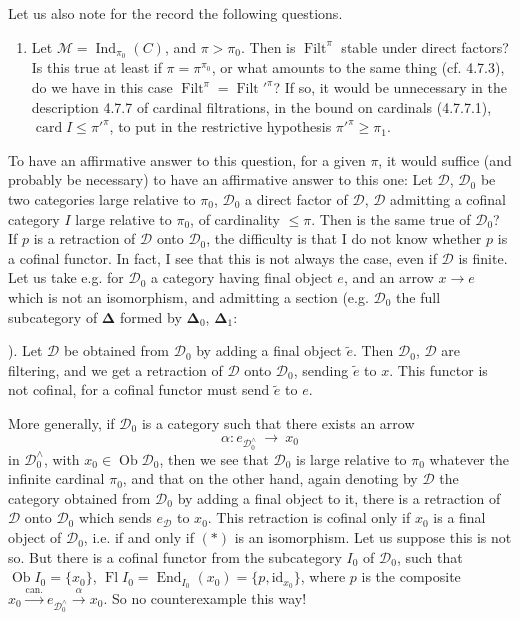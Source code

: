 \documentclass[11pt]{article}
\newcommand{\printedpage}[1]{\marginpar{\footnotesize p.~#1}}
\newcommand{\msp}[1]{\marginpar{\footnotesize [#1]}}
\newcommand{\Ob}{\operatorname{Ob}}
\newcommand{\Ind}{\operatorname{Ind}}
\newcommand{\Filt}{\operatorname{Filt}}
\newcommand{\card}{\operatorname{card}}
\newcommand{\End}{\operatorname{End}}
\newcommand{\Fl}{\operatorname{Fl}}
\begin{document}
\msp{page 203}
Let us also note for the record the following questions.
\begin{enumerate}
\item[3)] Let $\mathcal{M}=\Ind_{\pi_0}(C)$, and $\pi>\pi_0$. Then is $\Filt^\pi$ stable under direct factors? Is this true at least if $\pi=\pi^{\pi_0}$, or what amounts to the same thing (cf. 4.7.3), do we have in this case $\Filt^\pi=\Filt'^{\pi}$? If so, it would be unnecessary in the description 4.7.7 of cardinal filtrations, in the bound on cardinals (4.7.7.1), $\card I\leqslant\pi'^{\pi}$, to put in the restrictive hypothesis $\pi'^{\pi}\geqslant\pi_1$.
\end{enumerate}

To have an affirmative answer to this question, for a given $\pi$, it would suffice (and probably be necessary) to have an affirmative answer to this one: Let $\mathcal{D}$, $\mathcal{D}_0$ be two categories large relative to $\pi_0$, $\mathcal{D}_0$ a direct factor of $\mathcal{D}$, $\mathcal{D}$ admitting a cofinal category $I$ large relative to $\pi_0$, of cardinality $\leqslant\pi$. Then is the same true of $\mathcal{D}_0$? If $p$ is a retraction of $\mathcal{D}$ onto $\mathcal{D}_0$, the difficulty is that I do not know whether $p$ is a cofinal functor. In fact, I see that
\printedpage{72}
\msp{page 204}
this is not always the case, even if $\mathcal{D}$ is finite. Let us take e.g. for $\mathcal{D}_0$ a category having final object $e$, and an arrow $x\longrightarrow e$ which is not an isomorphism, and admitting a section (e.g. $\mathcal{D}_0$ the full subcategory of $\boldsymbol{\Delta}$ formed by $\boldsymbol{\Delta}_0$, $\boldsymbol{\Delta}_1$:  ). Let $\mathcal{D}$ be obtained from $\mathcal{D}_0$ by adding a final object $\tilde{e}$. Then $\mathcal{D}_0$, $\mathcal{D}$ are filtering, and we get a retraction of $\mathcal{D}$ onto $\mathcal{D}_0$, sending $\tilde{e}$ to $x$. This functor is not cofinal, for a cofinal functor must send $\tilde{e}$ to $e$.

More generally, if $\mathcal{D}_0$ is a category such that there exists an arrow
\[
\alpha : e_{\mathcal{D}_0^\wedge} \ \longrightarrow \ x_0 \tag*{$(*)$}
\]
in $\mathcal{D}_0^\wedge$, with $x_0\in\Ob\mathcal{D}_0$, then we see that $\mathcal{D}_0$ is large relative to $\pi_0$ whatever the infinite cardinal $\pi_0$, and that on the other hand, again denoting by $\mathcal{D}$ the category obtained from $\mathcal{D}_0$ by adding a final object to it, there is a retraction of $\mathcal{D}$ onto $\mathcal{D}_0$ which sends $e_{\mathcal{D}}$ to $x_0$. This retraction is cofinal only if $x_0$ is a final object of $\mathcal{D}_0$, i.e. if and only if $(*)$ is an isomorphism. Let us suppose this is not so. But there is a cofinal functor from the subcategory $I_0$ of $\mathcal{D}_0$, such that $\Ob I_0=\{x_0\}$, $\Fl I_0=\End_{I_0}(x_0)=\{p,\mathrm{id}_{x_0}\}$, where $p$ is the composite $x_0\xrightarrow{\text{can.}}e_{\mathcal{D}_0^\wedge}\xrightarrow{\alpha}x_0$. So no counterexample this way!
\end{document}
